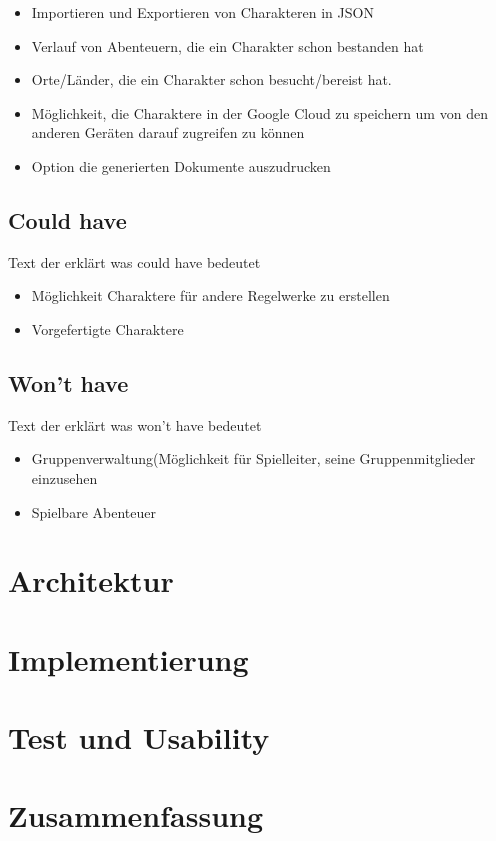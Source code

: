\begin{itemize}
	\item Importieren und Exportieren von Charakteren in JSON
	\item Verlauf von Abenteuern, die ein Charakter schon bestanden hat
	\item Orte/Länder, die ein Charakter schon besucht/bereist hat.
	\item Möglichkeit, die Charaktere in der Google Cloud zu speichern um von den anderen Geräten darauf zugreifen zu können
	\item Option die generierten Dokumente auszudrucken
\end{itemize}

\subsection{Could have}

Text der erklärt was could have bedeutet

\begin{itemize}
	\item Möglichkeit Charaktere für andere Regelwerke zu erstellen
	\item Vorgefertigte Charaktere
\end{itemize}

\subsection{Won't have}

Text der erklärt was won't have bedeutet

\begin{itemize}
	\item Gruppenverwaltung(Möglichkeit für Spielleiter, seine Gruppenmitglieder einzusehen
	\item Spielbare Abenteuer
\end{itemize}

\section{Architektur}

\section{Implementierung}

\section{Test und Usability}

\section{Zusammenfassung}
